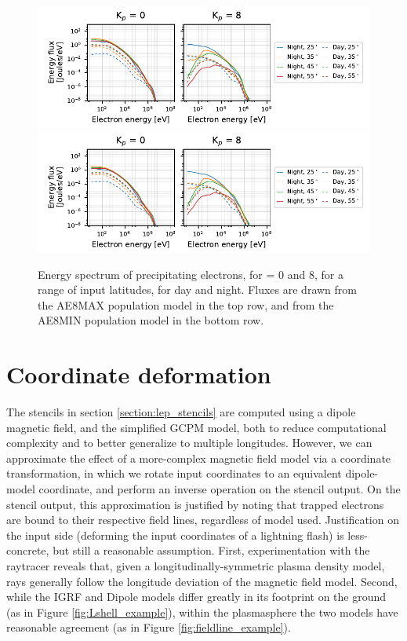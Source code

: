 \begin{figure}[t]
\begin{center}
\includegraphics[clip]{figures/stencil_energy_spectrum.pdf}
\includegraphics[clip]{figures/stencil_energy_spectrum_AE8MIN_flux_0.pdf}
\caption[Energy spectrum of LEP stencils]{Energy spectrum of precipitating electrons, for \kp{}= 0 and 8, for a range of input latitudes, for day and night. Fluxes are drawn from the AE8MAX population model in the top row, and from the AE8MIN population model in the bottom row.}
\label{fig:stencil_energy_spectrum}
\end{center}
\end{figure}


\section{Coordinate deformation}
The stencils in section \ref{section:lep_stencils} are computed using a dipole magnetic field, and the simplified GCPM model, both to reduce computational complexity and to better generalize to multiple longitudes. However, we can approximate the effect of a more-complex magnetic field model via a coordinate transformation, in which we rotate input coordinates to an equivalent dipole-model coordinate, and perform an inverse operation on the stencil output. On the stencil output, this approximation is justified by noting that trapped electrons are bound to their respective field lines, regardless of model used. Justification on the input side (deforming the input coordinates of a lightning flash) is less-concrete, but still a reasonable assumption. First, experimentation with the raytracer reveals that, given a longitudinally-symmetric plasma density model, rays generally follow the longitude deviation of the magnetic field model. Second, while the IGRF and Dipole models differ greatly in its footprint on the ground (as in Figure \ref{fig:Lshell_example}), within the plasmasphere the two models have reasonable agreement (as in Figure \ref{fig:fieldline_example}).

